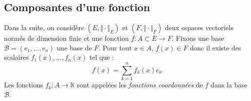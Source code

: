 \documentclass[a4paper,10pt]{report}
\begin{document}
%
%
%
%
%

\subsection{Composantes d'une fonction}

\noindent Dans la suite, on considère $(E, \Vert \cdot \Vert_E)$ et $(F, \Vert \cdot \Vert_F)$ deux espaces vectoriels normés de dimension finie et une fonction $f : A \subset E \rightarrow F$. Fixons une base $\mathcal{B}=(e_1, \ldots, e_n)$ une base de $F$. Pour tout $x \in A$, $f(x) \in F$ donc il existe des scalaires $f_1(x), \ldots, f_n(x)$ tel que :
 $$ f(x) = \sum_{k=1}^n f_k(x) e_k$$
Les fonctions $f_k : A \rightarrow \mathbb{K}$ sont appelées les \textit{fonctions coordonnées} de $f$ dans la base $\mathcal{B}$.
\end{document}
